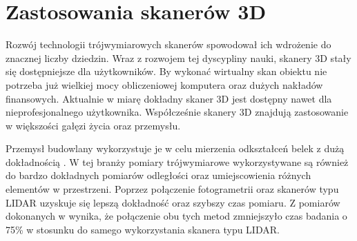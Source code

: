 \section{Zastosowania skanerów 3D}
Rozwój technologii trójwymiarowych skanerów spowodował ich wdrożenie do znacznej liczby dziedzin. Wraz z rozwojem tej dyscypliny nauki, skanery 3D stały się dostępniejsze dla użytkowników. By wykonać wirtualny skan obiektu nie potrzeba już wielkiej mocy obliczeniowej komputera oraz dużych nakładów finansowych. Aktualnie w miarę dokładny skaner 3D jest dostępny nawet dla nieprofesjonalnego użytkownika.
Współcześnie skanery 3D znajdują zastosowanie w większości gałęzi życia oraz przemysłu. 

Przemysł budowlany wykorzystuje je w celu mierzenia odkształceń belek z dużą dokładnością \cite{goszczynska2014doswiadczalna}. W tej branży pomiary trójwymiarowe wykorzystywane są również do bardzo dokładnych pomiarów odległości oraz umiejscowienia różnych elementów w przestrzeni. Poprzez połączenie fotogrametrii oraz skanerów typu LIDAR uzyskuje się lepszą dokładność oraz szybszy czas pomiaru. Z pomiarów dokonanych w \cite{el2008integrating} wynika, że połączenie obu tych metod zmniejszyło czas badania o 75\% w stosunku do samego wykorzystania skanera typu LIDAR.


